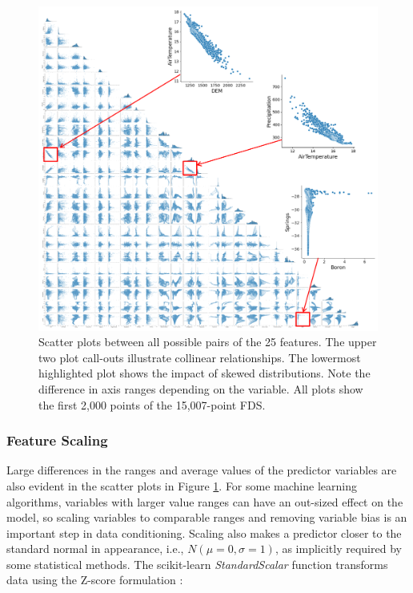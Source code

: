 \begin{figure}[!htp]
\centering
\includegraphics[width=\textwidth]{templates/images/Figure-Scatterplot_Unscaled_Features.png}
\caption[Unscaled FDS scatter plots]{Scatter plots between all possible pairs of the 25 features. The upper two plot call-outs illustrate collinear relationships. The lowermost highlighted plot shows the impact of skewed distributions. Note the difference in axis ranges depending on the variable. All plots show the first 2,000 points of the 15,007-point FDS.}
\label{fig:unscaled_scatter}
\end{figure}

\subsubsection{Feature Scaling}\label{ch3:scaling}
Large differences in the ranges and average values of the predictor variables are also evident in the scatter plots in Figure \ref{fig:unscaled_scatter}. For some machine learning algorithms, variables with larger value ranges can have an out-sized effect on the model, so scaling variables to comparable ranges and removing variable bias is an important step in data conditioning. Scaling also makes a predictor closer to the standard normal in appearance, i.e., $N(\mu=0, \sigma=1)$, as implicitly required by some statistical methods. The scikit-learn \textit{StandardScalar} function transforms data using the Z-score formulation \citep{scikit-learn_sklearnpreprocessingstandardscaler_2021}:

